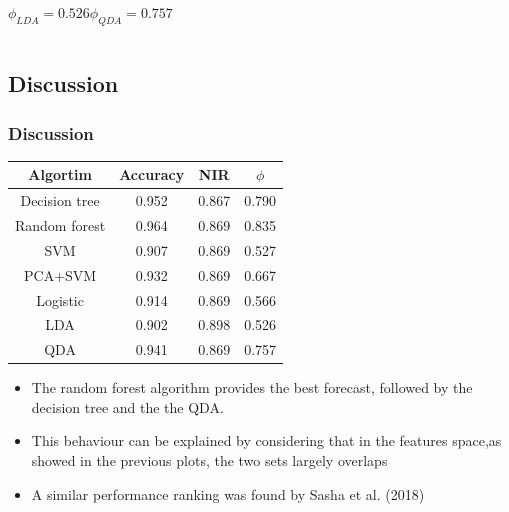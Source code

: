 \documentclass[compress]{beamer}
\begin{document}
\begin{frame}
\begin{columns}
\begin{center}
$\phi_{LDA}=0.526$\quad$\phi_{QDA}=0.757$
\end{center}
\end{columns}
\end{frame}


\subsection{Discussion}
\begin{frame}
\frametitle{Discussion}
\begin{table}[]
\begin{center}
\begin{tabular}{c||c|c|c}
{\color[HTML]{CB0000} \textbf{Algortim}} & {\color[HTML]{CB0000} \textbf{Accuracy}} & {\color[HTML]{CB0000} \textbf{NIR}} & {\color[HTML]{CB0000} \textbf{$\phi$}} \\ \hline\hline
Decision tree                            & 0.952                                    & 0.867                               & 0.790                                  \\ \hline
Random forest                            & 0.964                                    & 0.869                               & 0.835                                  \\ \hline
SVM                                      & 0.907                                    & 0.869                               & 0.527                                  \\ \hline
PCA+SVM                                  & 0.932                                    & 0.869                               & 0.667                                  \\ \hline
Logistic                                 & 0.914                                    & 0.869                               & 0.566                                  \\ \hline
LDA                                      & 0.902                                    & 0.898                               & 0.526                                  \\ \hline
QDA                                      & 0.941                                    & 0.869                               & 0.757 
                             
\end{tabular}
\end{center}
\end{table}
\begin{itemize}
\item The random forest algorithm provides the best forecast, followed by the decision tree and the the QDA. 
\item This behaviour can be explained by considering that in the features space,as showed in the previous plots, the two sets largely overlaps
\item A similar performance ranking was found by Sasha et al. (2018) \cite{saha2018machine}

\end{itemize}
\end{frame}
\end{document}
